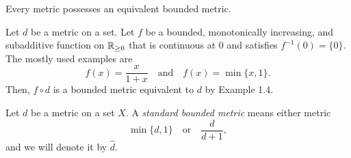 \documentclass{../note}
\begin{document}
\begin{prop}
Every metric possesses an equivalent bounded metric.
\end{prop}
\begin{pf}
Let $d$ be a metric on a set.
Let $f$ be a bounded, monotonically increasing, and subadditive function on $\mathbb{R}_{\ge0}$ that is continuous at 0 and satisfies $f^{-1}(0)=\{0\}$.
The mostly used examples are
\[f(x)=\frac x{1+x}\quad\text{and}\quad f(x)=\min\{x,1\}.\]
Then, $f\circ d$ is a bounded metric equivalent to $d$ by Example 1.4.
\end{pf}

\begin{defn}
Let $d$ be a metric on a set $X$.
A \emph{standard bounded metric} means either metric
\[\min\{d,1\}\quad\text{or}\quad\frac d{d+1},\]
and we will denote it by $\hat d$.
\end{defn}
\end{document}
